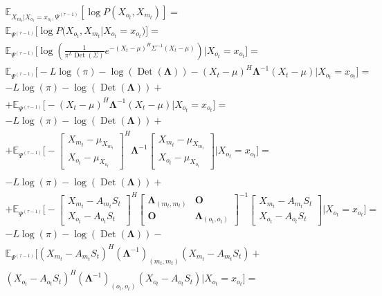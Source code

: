 \documentclass[11pt]{article}
\newcommand{\Expect}{\mathbb{E}}
\DeclareMathOperator{\Det}{Det}
\begin{document}
\begin{equation*}
\begin{gathered}
\Expect_{X_{m_t}|X_{o_t}=x_{o_t}, \Psi^{(\tau-1)}}[\log P(X_{o_t}, X_{m_t})]=\\
\Expect_{\Psi^{(\tau-1)}}\Big[\log P\Big(X_{o_t}, X_{m_t}\Big|X_{o_t}=x_{o_t}\Big)\Big]=\\
\Expect_{\Psi^{(\tau-1)}}\bigg[\log \left(\frac{1}{\pi^{L}\Det(\Sigma)}e^{-(X_t-\mu)^H\Sigma^{-1}(X_t-\mu)}\right)\Big|X_{o_t}=x_{o_t}\bigg]=\\
\Expect_{\Psi^{(\tau-1)}}\bigg[-L \log(\pi) - \log (\Det(\mathbf{\Lambda})) - (X_t - \mu)^H\mathbf{\Lambda}^{-1}(X_t - \mu)\Big|X_{o_t}=x_{o_t}\bigg]=\\
-L \log(\pi) - \log (\Det(\mathbf{\Lambda})) + \\ + \Expect_{\Psi^{(\tau-1)}}\bigg[- (X_t - \mu)^H\mathbf{\Lambda}^{-1}(X_t - \mu)\Big|X_{o_t}=x_{o_t}\bigg]=\\
-L \log(\pi) - \log (\Det(\mathbf{\Lambda}))  + \\ + \Expect_{\Psi^{(\tau-1)}}\bigg[- 
\begin{bmatrix} X_{m_t} - \mu_{X_{m_t}} \\  X_{o_t} - \mu_{X_{o_t}} \end{bmatrix}^H \mathbf{\Lambda}^{-1}
\begin{bmatrix} X_{m_t} - \mu_{X_{m_t}} \\  X_{o_t} - \mu_{X_{o_t}} \end{bmatrix}\Big|X_{o_t}=x_{o_t}\bigg] = \\
\end{gathered}
\end{equation*}
\begin{equation*}
\begin{gathered}
-L \log(\pi) - \log (\Det(\mathbf{\Lambda}))  + \\ + \Expect_{\Psi^{(\tau-1)}}\bigg[- 
\begin{bmatrix} X_{m_t} - A_{m_t}S_t \\  X_{o_t} - A_{o_t}S_t  \end{bmatrix}^H
\begin{bmatrix} \mathbf{\Lambda}_{(m_t, m_t)} & \mathbf{O} \\  \mathbf{O} & \mathbf{\Lambda}_{(o_t, o_t)} \end{bmatrix}^{-1}
\begin{bmatrix} X_{m_t} - A_{m_t}S_t \\  X_{o_t} - A_{o_t}S_t  \end{bmatrix}\Big|X_{o_t}=x_{o_t}\bigg] = \\
-L \log(\pi) - \log (\Det(\mathbf{\Lambda}))  - \\ \Expect_{\Psi^{(\tau-1)}}
\bigg[ (X_{m_t} - A_{m_t}S_t)^H (\mathbf{\Lambda}^{-1})_{(m_t, m_t)} (X_{m_t} - A_{m_t}S_t) + \\
(X_{o_t} - A_{o_t}S_t)^H (\mathbf{\Lambda}^{-1})_{(o_t, o_t)} (X_{o_t} - A_{o_t}S_t)
\Big|X_{o_t}=x_{o_t}\bigg] = \\
\end{gathered}
\end{equation*}
\end{document}
